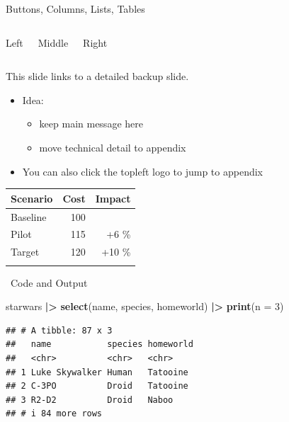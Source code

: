 \documentclass[10pt,aspectratio=169,]{beamer}
\newenvironment{Shaded}{\begin{snugshade}}{\end{snugshade}}
\newcommand{\AttributeTok}[1]{\textcolor[rgb]{0.13,0.29,0.53}{#1}}
\newcommand{\DecValTok}[1]{\textcolor[rgb]{0.00,0.00,0.81}{#1}}
\newcommand{\FunctionTok}[1]{\textcolor[rgb]{0.13,0.29,0.53}{\textbf{#1}}}
\newcommand{\NormalTok}[1]{#1}
\newcommand{\SpecialCharTok}[1]{\textcolor[rgb]{0.81,0.36,0.00}{\textbf{#1}}}
\begin{document}
\begin{frame}{Buttons, Columns, Lists, Tables}
\label{buttons-columns-lists-tables}
\hypertarget{buttons_slide}{}

\begin{columns}[T,totalwidth=\textwidth]
Left

\hfill

Middle

\hfill

Right

\end{columns}

\vfill

This slide links to a detailed backup slide.


\begin{itemize}
\tightlist
\item
  Idea:

  \begin{itemize}
  \tightlist
  \item
    keep main message here
  \item
    move technical detail to appendix
  \end{itemize}
\item
  You can also click the topleft logo to jump to appendix
\end{itemize}

\vfill

\begin{longtable}[]{@{}lrr@{}}
\toprule\noalign{}
Scenario & Cost & Impact \\
\midrule\noalign{}
\endhead
Baseline & 100 & \\
Pilot & 115 & +6 \% \\
Target & 120 & +10 \% \\
\bottomrule\noalign{}
\end{longtable}
\end{frame}

\begin{frame}[fragile]{~Code and Output}
\label{code-and-output}
\begin{Shaded}
\begin{Highlighting}[]
\NormalTok{starwars }\SpecialCharTok{|\textgreater{}}
  \FunctionTok{select}\NormalTok{(name, species, homeworld) }\SpecialCharTok{|\textgreater{}}
  \FunctionTok{print}\NormalTok{(}\AttributeTok{n =} \DecValTok{3}\NormalTok{)}
\end{Highlighting}
\end{Shaded}

\begin{verbatim}
## # A tibble: 87 x 3
##   name           species homeworld
##   <chr>          <chr>   <chr>    
## 1 Luke Skywalker Human   Tatooine 
## 2 C-3PO          Droid   Tatooine 
## 3 R2-D2          Droid   Naboo    
## # i 84 more rows
\end{verbatim}
\end{frame}
\end{document}
